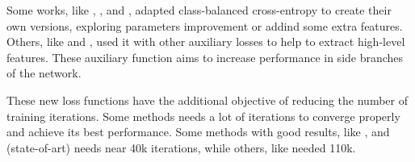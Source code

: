 Some works, like \cite{Kokkinos:2016}, \cite{COB:2018:7917294}, \cite{RCF:2019} and \cite{ReExtraction:Wen201884}, adapted class-balanced cross-entropy to create their own versions, exploring parameters improvement or addind some extra features.
Others, like \cite{LearningHybrid:Hu2018377} and \cite{He:2019}, used it with other auxiliary losses to help to extract high-level features.
These auxiliary function aims to increase performance in side branches of the network.

These new loss functions have the additional objective of reducing the number of training iterations.
Some methods needs a lot of iterations to converge properly and achieve its best performance.
Some methods with good results, like \cite{RCF:2019}, \cite{Yang:2019} and \cite{He:2019} (state-of-art) needs near 40k iterations, while others, like \cite{ProeminentEdge:2018:Cai2018} needed 110k.

% 

